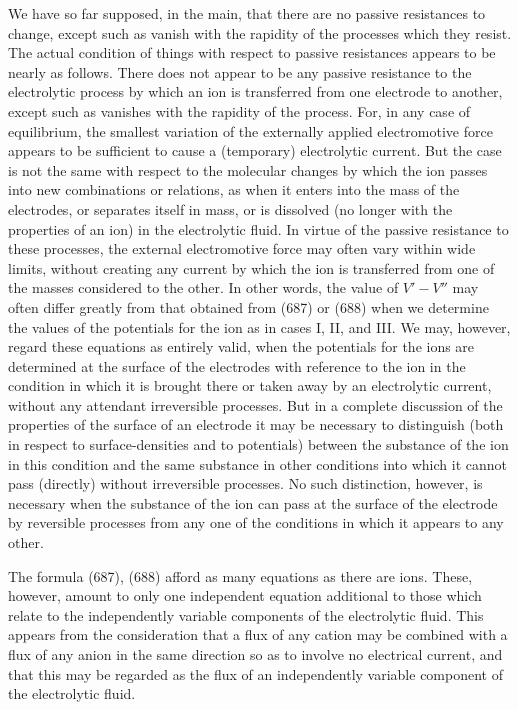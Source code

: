 \documentclass[12pt]{memoir}
\begin{document}
We have so far supposed, in the main, that there are no passive resistances to change, except such as vanish with the rapidity of the processes which they resist. The actual condition of things with respect to passive resistances appears to be nearly as follows. There does not appear to be any passive resistance to the electrolytic process by which an ion is transferred from one electrode to another, except such as vanishes with the rapidity of the process. For, in any case of equilibrium, the smallest variation of the externally applied electromotive force appears to be sufficient to cause a (temporary) electrolytic current. But the case is not the same with respect to the molecular changes by which the ion passes into new combinations or relations, as when it enters into the mass of the electrodes, or separates itself in mass, or is dissolved (no longer with the properties of an ion) in the electrolytic fluid. In virtue of the passive resistance to these processes, the external electromotive force may often vary within wide limits, without creating any current by which the ion is transferred from one of the masses considered to the other. In other words, the value of $V'- V''$ may often differ greatly from that obtained from (687) or (688) when we determine the values of the potentials for the ion as in cases I, II, and III. We may, however, regard these equations as entirely valid, when the potentials for the ions are determined at the surface of the electrodes with reference to the ion in the condition in which it is brought there or taken away by an electrolytic current, without any attendant irreversible processes. But in a complete discussion of the properties of the surface of an electrode it may be necessary to distinguish (both in respect to surface-densities and to potentials) between the substance of the ion in this condition and the same substance in other conditions into which it cannot pass (directly) without irreversible processes. No such distinction, however, is necessary when the substance of the ion can pass at the surface of the electrode by reversible processes from any one of the conditions in which it appears to any other.

The formula (687), (688) afford as many equations as there are ions. These, however, amount to only one independent equation additional to those which relate to the independently variable components of the electrolytic fluid. This appears from the consideration that a flux of any cation may be combined with a flux of any anion in the same direction so as to involve no electrical current, and that this may be regarded as the flux of an independently variable component of the electrolytic fluid.
\end{document}
